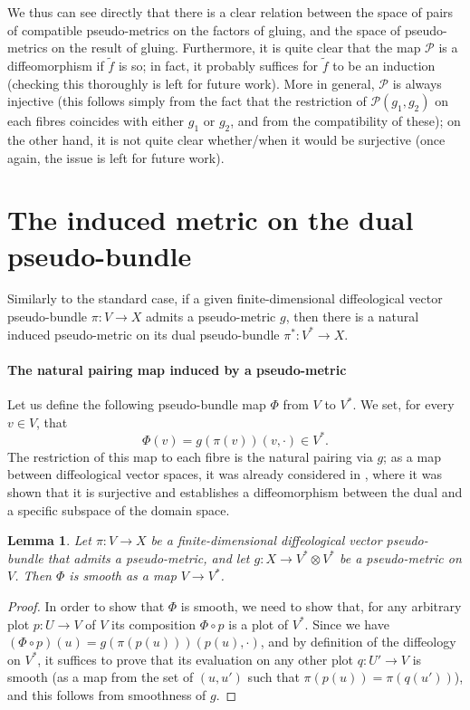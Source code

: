 \documentclass{article}
\newtheorem{lemma}{Lemma}[section]
\begin{document}
We thus can see directly that there is a clear relation between the space of pairs of compatible pseudo-metrics on the factors of gluing, and the space of pseudo-metrics on the result of gluing. Furthermore, it 
is quite clear that the map $\mathcal{P}$ is a diffeomorphism if $\tilde{f}$ is so; in fact, it probably suffices for $\tilde{f}$ to be an induction (checking this thoroughly is left for future work). More in general, 
$\mathcal{P}$ is always injective (this follows simply from the fact that the restriction of $\mathcal{P}(g_1,g_2)$ on each fibres coincides with either $g_1$ or $g_2$, and from the compatibility of these); on the 
other hand, it is not quite clear whether/when it would be surjective (once again, the issue is left for future work).



\section{The induced metric on the dual pseudo-bundle}

Similarly to the standard case, if a given finite-dimensional diffeological vector pseudo-bundle $\pi:V\to X$ admits a pseudo-metric $g$, then there is a natural induced pseudo-metric on its dual pseudo-bundle 
$\pi^*:V^*\to X$.

\paragraph{The natural pairing map induced by a pseudo-metric} Let us define the following pseudo-bundle map $\Phi$ from $V$ to $V^*$. We set, for every $v\in V$, that
$$\Phi(v)=g(\pi(v))(v,\cdot)\in V^*.$$ The restriction of this map to each fibre is the natural pairing via $g$; as a map between diffeological vector spaces, it was already considered in \cite{pseudometric}, where 
it was shown that it is surjective and establishes a diffeomorphism between the dual and a  specific subspace of the domain space.

\begin{lemma}\label{Phi:smooth:linear:maps:bundle:lem}
Let $\pi:V\to X$ be a finite-dimensional diffeological vector pseudo-bundle that admits a pseudo-metric, and let $g:X\to V^*\otimes V^*$ be a pseudo-metric on $V$. Then $\Phi$ is smooth as a map $V\to V^*$.
\end{lemma}

\begin{proof}
In order to show that $\Phi$ is smooth, we need to show that, for any arbitrary plot $p:U\to V$ of $V$ its composition $\Phi\circ p$ is a plot of $V^*$. Since we have $(\Phi\circ p)(u)=g(\pi(p(u)))(p(u),\cdot)$, and 
by definition of the diffeology on $V^*$, it suffices to prove that its evaluation on any other plot $q:U'\to V$ is smooth (as a map from the set of $(u,u')$ such that $\pi(p(u))=\pi(q(u'))$), and this follows from smoothness of $g$.
\end{proof}
\end{document}
